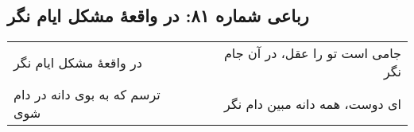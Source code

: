 \begin{center}
\section*{رباعی شماره ۸۱: در واقعهٔ مشکل ایام نگر}
\label{sec:081}
\begin{longtable}{l p{0.5cm} r}
در واقعهٔ مشکل ایام نگر
&&
جامی است تو را عقل، در آن جام نگر
\\
ترسم که به بوی دانه در دام شوی
&&
ای دوست، همه دانه مبین دام نگر
\\
\end{longtable}
\end{center}
